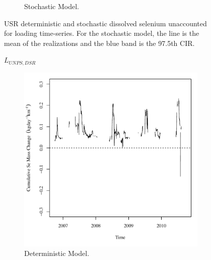 \begin{landscape}
\begin{figure}
\begin{subfigure}{0.7\textwidth}
			\caption{Stochastic Model.}
		\end{subfigure}
		\caption[USR deterministic and stochastic dissolved selenium unaccounted for loading time-series.]{USR deterministic and stochastic dissolved selenium unaccounted for loading time-series.  For the stochastic model, the line is the mean of the realizations and the blue band is the 97.5th CIR.}
		\label{fig:USRMass}
	\end{figure}
\end{landscape}
\subfiguretop
\begin{landscape}
	\begin{figure}
		$ \displaystyle L_{UNPS,DSR} $
		\begin{subfigure}{0.7\textwidth}
			\centering
			\includegraphics[width=\tableCustomSize]{"Figures/Results_DSR/Deterministic/Balance Mass"}
			\caption{Deterministic Model.}
		\end{subfigure}%
		\begin{subfigure}{0.7\textwidth}
			\centering

\end{subfigure}
\end{figure}
\end{landscape}
